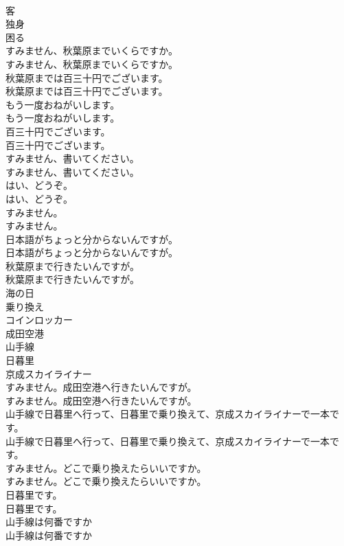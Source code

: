 \documentclass[8pt]{extreport}
\begin{document}
\begin{CJK}{UTF8}{min}
\\	客
\\	独身
\\	困る
\\	すみません、秋葉原までいくらですか。	
\\	すみません、秋葉原までいくらですか。 
\\	秋葉原までは百三十円でございます。	
\\	秋葉原までは百三十円でございます。 
\\	もう一度おねがいします。	
\\	もう一度おねがいします。 
\\	百三十円でございます。	
\\	百三十円でございます。 
\\	すみません、書いてください。	
\\	すみません、書いてください。 
\\	はい、どうぞ。	
\\	はい、どうぞ。 
\\	すみません。	
\\	すみません。 
\\	日本語がちょっと分からないんですが。	
\\	日本語がちょっと分からないんですが。 
\\	秋葉原まで行きたいんですが。	
\\	秋葉原まで行きたいんですが。 
\\	海の日
\\	乗り換え
\\	コインロッカー
\\	成田空港
\\	山手線
\\	日暮里
\\	京成スカイライナー
\\	すみません。成田空港へ行きたいんですが。	
\\	すみません。成田空港へ行きたいんですが。 
\\	山手線で日暮里へ行って、日暮里で乗り換えて、京成スカイライナーで一本です。	
\\	山手線で日暮里へ行って、日暮里で乗り換えて、京成スカイライナーで一本です。 
\\	すみません。どこで乗り換えたらいいですか。	
\\	すみません。どこで乗り換えたらいいですか。 
\\	日暮里です。	
\\	日暮里です。 
\\	山手線は何番ですか
\\	山手線は何番ですか

\end{CJK}
\end{document}
